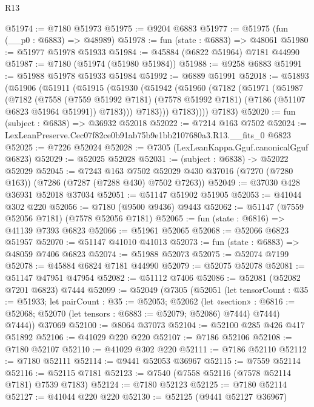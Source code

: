 \begin{lexlean}{R13}
\begin{coremodule}
@51974 := @7180 @51973
@51975 := @9204 @6883
@51977 := @51975 (fun (__p0 : @6883) => @48989)
@51978 := fun (state : @6883) => @48061
@51980 := @51977 @51978 @51933
@51984 := @45884 (@6822 @51964) @7181 @44990
@51987 := @7180 (@51974 (@51980 @51984))
@51988 := @9258 @6883
@51991 := @51988 @51978 @51933 @51984
@51992 := @6889 @51991
@52018 := @51893
    (@51906
      (@51911
        (@51915
          (@51930
            (@51942
              (@51960
                (@7182
                  (@51971
                    (@51987
                      (@7182
                        (@7558
                          (@7559 @51992 @7181)
                          (@7578 @51992 @7181)
                          (@7186 (@51107 @6823 @51964 @51991))
                          @7183)))
                    @7183)))
              @7183))))
      @7183)
@52020 := fun (subject : @6838) => @36932 @52018
@52022 := @7214 @163 @7502
@52024 := LexLeanPreserve.Cec07f82ce0b91ab75b9e1bb2107680a3.R13.__fits_0 @6823
@52025 := @7226 @52024
@52028 := @7305 (LexLeanKappa.Gguf.canonicalGguf @6823)
@52029 := @52025 @52028
@52031 := (subject : @6838) -> @52022 @52029
@52045 := @7243
    @163
    @7502
    @52029
    @430
    @37016
    (@7270 (@7280 @163))
    (@7286 (@7287 (@7288 @430) @7502 @7263))
@52049 := @37030 @428 @36931 @52018 @37034
@52051 := @51147 @51902 @51905
@52053 := @41044 @302 @220
@52056 := @7180 (@9500 @9436) @9443
@52062 := @51147 (@7559 @52056 @7181) (@7578 @52056 @7181)
@52065 := fun (state : @6816) => @41139 @7393 @6823
@52066 := @51961 @52065
@52068 := @52066 @6823 @51957
@52070 := @51147 @41010 @41013
@52073 := fun (state : @6883) => @48059 @7406 @6823
@52074 := @51988 @52073
@52075 := @52074 @7199
@52078 := @45884 @6824 @7181 @44990
@52079 := @52075 @52078
@52081 := @51147 @47951 @47954
@52082 := @51112 @7406
@52086 := @52081 (@52082 @7201 @6823) @7444
@52099 := @52049
    (@7305
      (@52051
        (let tensorCount : @35 := @51933;
        let pairCount : @35 := @52053;
        @52062
          (let «section» : @6816 := @52068; @52070 (let tensors : @6883 := @52079; @52086) @7444)
          @7444)
        @7444))
    @37069
@52100 := @8064 @37073
@52104 := @52100 @285 @426 @417 @51892
@52106 := @41029 @220 @220
@52107 := @7186 @52106
@52108 := @7180 @52107
@52110 := @41029 @302 @220
@52111 := @7186 @52110
@52112 := @7180 @52111
@52114 := @9441 @52053 @36967
@52115 := @7559 @52114
@52116 := @52115 @7181
@52123 := @7540 (@7558 @52116 (@7578 @52114 @7181) @7539 @7183)
@52124 := @7180 @52123
@52125 := @7180 @52114
@52127 := @41044 @220 @220
@52130 := @52125 (@9441 @52127 @36967)

\end{coremodule}
\end{lexlean}
